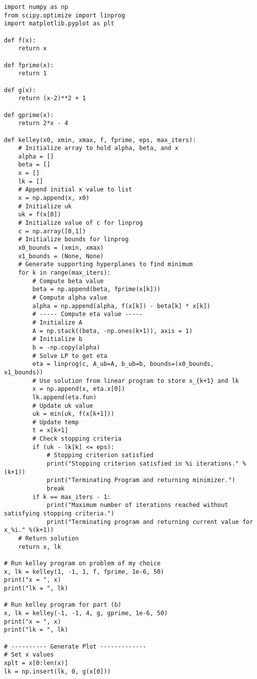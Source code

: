 \documentclass[11pt]{article}
\theoremstyle{definition}
\begin{document}
\begin{scriptsize}
\begin{verbatim}
import numpy as np
from scipy.optimize import linprog
import matplotlib.pyplot as plt

def f(x):
    return x

def fprime(x):
    return 1
  
def g(x):
    return (x-2)**2 + 1

def gprime(x):
    return 2*x - 4
  
def kelley(x0, xmin, xmax, f, fprime, eps, max_iters):
    # Initialize array to hold alpha, beta, and x
    alpha = []
    beta = []
    x = []
    lk = []
    # Append initial x value to list
    x = np.append(x, x0)
    # Initialize uk
    uk = f(x[0])
    # Initialize value of c for linprog
    c = np.array([0,1])
    # Initialize bounds for linprog
    x0_bounds = (xmin, xmax)
    x1_bounds = (None, None)
    # Generate supporting hyperplanes to find minimum
    for k in range(max_iters):
        # Compute beta value
        beta = np.append(beta, fprime(x[k]))
        # Compute alpha value
        alpha = np.append(alpha, f(x[k]) - beta[k] * x[k])
        # ----- Compute eta value -----
        # Initialize A
        A = np.stack((beta, -np.ones(k+1)), axis = 1)
        # Initialize b
        b = -np.copy(alpha)
        # Solve LP to get eta 
        eta = linprog(c, A_ub=A, b_ub=b, bounds=(x0_bounds, x1_bounds))
        # Use solution from linear program to store x_{k+1} and lk
        x = np.append(x, eta.x[0])
        lk.append(eta.fun)
        # Update uk value
        uk = min(uk, f(x[k+1]))
        # Update temp
        t = x[k+1]
        # Check stopping criteria
        if (uk - lk[k] <= eps):
            # Stopping criterion satisfied
            print("Stopping criterion satisfied in %i iterations." %(k+1)) 
            print("Terminating Program and returning minimizer.")
            break
        if k == max_iters - 1:
            print("Maximum number of iterations reached without satisfying stopping criteria.")
            print("Terminating program and returning current value for x_%i." %(k+1))
    # Return solution
    return x, lk
  
# Run kelley program on problem of my choice
x, lk = kelley(1, -1, 1, f, fprime, 1e-6, 50)
print("x = ", x)
print("lk = ", lk)

# Run kelley program for part (b)
x, lk = kelley(-1, -1, 4, g, gprime, 1e-6, 50)
print("x = ", x)
print("lk = ", lk)    

# ---------- Generate Plot -------------
# Set x values
xplt = x[0:len(x)]
lk = np.insert(lk, 0, g(x[0]))


\end{verbatim}
\end{scriptsize}
\end{document}
